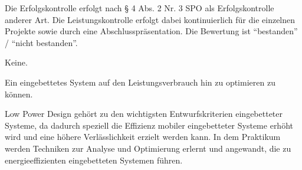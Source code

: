 \begin{course}

\setdoclanguagegerman
{}



\coursehead


\label{cour_7993.dp_997}


\begin{styleenv}
\begin{assessment}
Die Erfolgskontrolle erfolgt nach § 4 Abs. 2 Nr. 3 SPO als Erfolgskontrolle anderer Art. Die Leistungskontrolle erfolgt dabei kontinuierlich für die einzelnen Projekte sowie durch eine Abschlusspräsentation. Die Bewertung ist “bestanden” / “nicht bestanden”.


\end{assessment}

\begin{conditions}Keine.\end{conditions}


\end{styleenv}

\begin{learningoutcomes}
Ein eingebettetes System auf den Leistungsverbrauch hin zu optimieren zu können.


\end{learningoutcomes}

\begin{content}
Low Power Design gehört zu den wichtigsten Entwurfskriterien eingebetteter Systeme, da dadurch speziell die Effizienz mobiler eingebetteter Systeme erhöht wird und eine höhere Verlässlichkeit erzielt werden kann. In dem Praktikum werden Techniken zur Analyse und Optimierung erlernt und angewandt, die zu energieeffizienten eingebetteten Systemen führen.


\end{content}







\end{course}